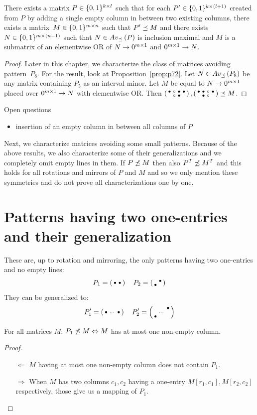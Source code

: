 \begin{prop}
There exists a matrix $P\in\{0,1\}^{k\times l}$ such that for each $P'\in\{0,1\}^{k\times(l+1)}$ created from $P$ by adding a single empty column in between two existing columns, there exists a matrix~$M\in\{0,1\}^{m\times n}$ such that $P'\preceq M$ and there exists $N\in\{0,1\}^{m\times(n-1)}$ such that $N\in Av_{\preceq}\left(P\right)$ is inclusion maximal and $M$ is a submatrix of an elementwise OR of $N\rightarrow 0^{m\times 1}$ and $0^{m\times 1}\rightarrow N$.
\end{prop}
\begin{proof}
Later in this chapter, we characterize the class of matrices avoiding pattern~$P_8$. For the result, look at Proposition~\ref{prop:p72}. Let $N\in Av_{\preceq}\left(P_8\right)$ be any matrix containing $P_5$ as an interval minor. Let $M$ be equal to $N\rightarrow 0^{m\times 1}$ placed over $0^{m\times 1}\rightarrow N$ with elementwise OR. Then $\left(\begin{smallmatrix}\bullet&\circ&\bullet&\bullet\\ &\circ&\bullet& \end{smallmatrix}\right),\left(\begin{smallmatrix}\bullet&\bullet&\circ&\bullet\\ &\bullet&\circ& \end{smallmatrix}\right)\preceq M$.
\end{proof}

Open questions
\begin{itemize}
	\item insertion of an empty column in between all columns of $P$
\end{itemize}

Next, we characterize matrices avoiding some small patterns. Because of the above results, we also characterize some of their generalizations and we completely omit empty lines in them. If $P\not\preceq M$ then also $P^T\not\preceq M^T$ and this holds for all rotations and mirrors of $P$ and $M$ and so we only mention these symmetries and do not prove all characterizations one by one.

\section{Patterns having two one-entries and their generalization}
\label{sec:2ones}
These are, up to rotation and mirroring, the only patterns having two one-entries and no empty lines:
$$P_1=\left(\begin{smallmatrix}\bullet&\bullet\end{smallmatrix}\right)\ \ \ P_2=\left(\begin{smallmatrix} &\bullet\\\bullet& \end{smallmatrix}\right)$$
They can be generalized to:
$$P'_1=\smm{\bullet&\cdots&\bullet}\ \ \ P'_2=\smm{ & &\bullet\\ &\cdots& \\\bullet& & }$$

\begin{prop}
For all matrices $M$: $P_1\not\preceq M\Leftrightarrow M$ has at most one non-empty column.
\end{prop}
\begin{proof}
\begin{itemize}
	\item[$\Leftarrow$] $M$ having at most one non-empty column does not contain $P_1$.
	\item[$\Rightarrow$] When $M$ has two columns $c_1,c_2$ having a one-entry $M[r_1,c_1],M[r_2,c_2]$ respectively, those give us a mapping of $P_1$.
\end{itemize}
\end{proof}

